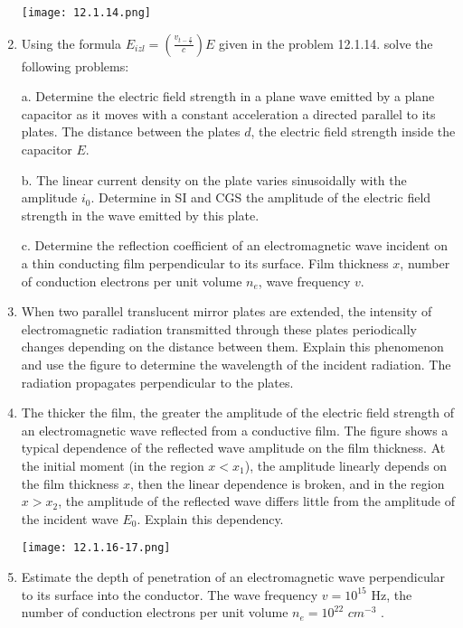 \documentclass{article}
\begin{document}
\begin{enumerate}[label=12.1.\arabic*]
\begin{center}
    \texttt{[image: 12.1.14.png]}
\end{center}


\item Using the formula $E_{izl} = (\frac{v_{t - \frac{x}{c}}}{c}) E$ given in the problem 12.1.14. solve the following problems: 

a. Determine the electric field strength in a plane wave emitted by a plane capacitor as it moves with a constant acceleration a directed parallel to its plates. The distance between the plates $d$, the electric field strength inside the capacitor $E$.

b. The linear current density on the plate varies sinusoidally with the amplitude $i_0$. Determine in SI and CGS the amplitude of the electric field strength in the wave emitted by this plate.

c. Determine the reflection coefficient of an electromagnetic wave incident on a thin conducting film perpendicular to its surface. Film thickness $x$, number of conduction electrons per unit volume $n_e$, wave frequency $v$.

\item When two parallel translucent mirror plates are extended, the intensity of electromagnetic radiation transmitted through these plates periodically changes depending on the distance between them. Explain this phenomenon and use the figure to determine the wavelength of the incident radiation. The radiation propagates perpendicular to the plates.

\item The thicker the film, the greater the amplitude of the electric field strength of an electromagnetic wave reflected from a conductive film. The figure shows a typical dependence of the reflected wave amplitude on the film thickness. At the initial moment (in the region $x < x_1$), the amplitude linearly depends on the film thickness $x$, then the linear dependence is broken, and in the region $x > x_2$, the amplitude of the reflected wave differs little from the amplitude of the incident wave $E_0$. Explain this dependency.

\begin{center}
    \texttt{[image: 12.1.16-17.png]}
\end{center}


\item Estimate the depth of penetration of an electromagnetic wave perpendicular to its surface into the conductor. The wave frequency $v = 10^{15}$ Hz, the number of conduction electrons per unit volume $n_e = 10^{22}$ $cm^{-3}$ .


\end{enumerate}
\end{document}
